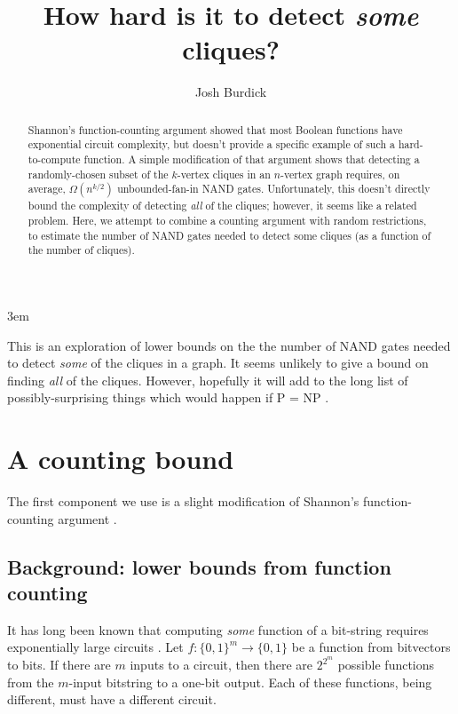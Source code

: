 \documentclass[12pt]{article}
\theoremstyle{definition}
\begin{document}
\emergencystretch 3em
\title{How hard is it to detect {\em some} cliques?}

\author{Josh Burdick}

\maketitle

\begin{abstract}
Shannon's function-counting argument
\cite{shannon_synthesis_1949} showed that most Boolean functions have
exponential circuit complexity, but doesn't provide a specific example
of such a hard-to-compute function. A simple modification of that argument
shows that detecting a randomly-chosen subset of the $k$-vertex cliques in an
$n$-vertex graph requires, on average, $\Omega(n^{k/2})$ unbounded-fan-in
NAND gates.
Unfortunately,
this doesn't directly bound the complexity of detecting {\em all} of the cliques;
however, it seems like a related problem.
Here, we attempt to combine a counting argument with
random restrictions, to estimate the number
of NAND gates needed to detect some cliques (as a function
of the number of cliques).
\end{abstract}

\newpage

\tableofcontents

\vspace{5mm}

This is an exploration of lower bounds on the the number of NAND gates
needed to detect {\em some} of the cliques in a graph.
It seems unlikely to give a bound on finding {\em all} of the cliques.
However, hopefully
it will add to the long list of possibly-surprising things which would happen
if P = NP \cite{fenner1996complexity}.

\section{A counting bound}
\label{countingBound}

The first component we use is a slight modification
of Shannon's function-counting argument
\cite{shannon_synthesis_1949}.

\subsection{Background: lower bounds from function counting}

It has long been known that computing {\em some} function of a bit-string
requires exponentially large circuits \cite{shannon_synthesis_1949}.
Let $f: \{0,1\}^m \rightarrow \{0,1\}$ be a function from bitvectors to bits.
If there are $m$ inputs to a circuit,
then there are $2^{2^m}$ possible functions from the $m$-input bitstring to
a one-bit output.
Each of these functions, being different, must have a
different circuit.
\end{document}
